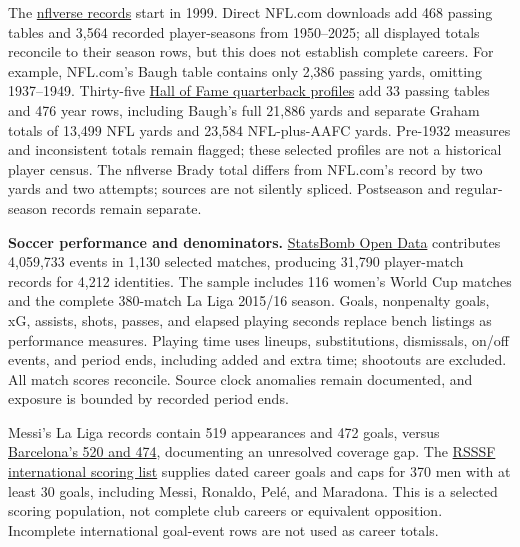 \documentclass[11pt,letterpaper]{article}
\newcommand{\src}[2]{\href{#1}{#2}}
\begin{document}
The \src{https://github.com/nflverse/nflverse-data/releases/tag/stats_player}{nflverse records} start in 1999.
Direct NFL.com downloads add 468 passing tables and 3,564 recorded player-seasons from 1950--2025; all displayed totals reconcile to their season rows, but this does not establish complete careers.
For example, NFL.com's Baugh table contains only 2,386 passing yards, omitting 1937--1949.
Thirty-five \src{https://www.profootballhof.com/hall-of-famers/positions}{Hall of Fame quarterback profiles} add 33 passing tables and 476 year rows, including Baugh's full 21,886 yards and separate Graham totals of 13,499 NFL yards and 23,584 NFL-plus-AAFC yards.
Pre-1932 measures and inconsistent totals remain flagged; these selected profiles are not a historical player census.
The nflverse Brady total differs from NFL.com's record by two yards and two attempts; sources are not silently spliced.
Postseason and regular-season records remain separate.

\textbf{Soccer performance and denominators.}
\src{https://github.com/hudl/open-data}{StatsBomb Open Data} contributes 4,059,733 events in 1,130 selected matches, producing 31,790 player-match records for 4,212 identities.
The sample includes 116 women's World Cup matches and the complete 380-match La Liga 2015/16 season.
Goals, nonpenalty goals, xG, assists, shots, passes, and elapsed playing seconds replace bench listings as performance measures.
Playing time uses lineups, substitutions, dismissals, on/off events, and period ends, including added and extra time; shootouts are excluded.
All match scores reconcile. Source clock anomalies remain documented, and exposure is bounded by recorded period ends.

Messi's La Liga records contain 519 appearances and 472 goals, versus \src{https://www.fcbarcelona.com/en/card/2214377/leo-messi}{Barcelona's 520 and 474}, documenting an unresolved coverage gap.
The \src{https://www.rsssf.org/miscellaneous/century.html}{RSSSF international scoring list} supplies dated career goals and caps for 370 men with at least 30 goals, including Messi, Ronaldo, Pel\'e, and Maradona.
This is a selected scoring population, not complete club careers or equivalent opposition.
Incomplete international goal-event rows are not used as career totals.
\end{document}
